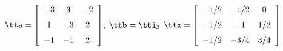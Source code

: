 {$\tta = \left[ \begin {array}{ccc} -3&3&-2 \\ \noalign{\medskip} 1&-3&2 \\ \noalign{\medskip} -1&-1&2\end {array} \right] $, 
 \quad
$\ttb=\tti_3 $}
{$\ttx=\left[ \begin {array}{ccc} -1/2 & -1/2 & 0\\ \noalign{\medskip} -1/2 & -1 & 1/2 \\ \noalign{\medskip} -1/2 & -3/4 & 3/4  \end {array} \right] $}

